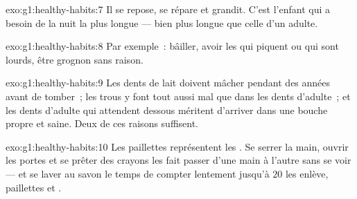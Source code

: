 \begin{solution}{exo:g1:healthy-habits:7}
Il se repose, se répare et grandit. C'est l'enfant qui a besoin de
la nuit la plus longue --- bien plus longue que celle d'un adulte.
\end{solution}

\begin{solution}{exo:g1:healthy-habits:8}
Par exemple~: bâiller, avoir les  qui piquent ou qui sont
lourds, être grognon sans raison.
\end{solution}

\begin{solution}{exo:g1:healthy-habits:9}
Les dents de lait doivent mâcher pendant des années avant de
tomber~; les trous y font tout aussi mal que dans les dents
d'adulte~; et les dents d'adulte qui attendent dessous méritent
d'arriver dans une bouche propre et saine. Deux de ces raisons
suffisent.
\end{solution}

\begin{solution}{exo:g1:healthy-habits:10}
Les paillettes représentent les . Se serrer la main, ouvrir
les portes et se prêter des crayons les fait passer d'une main à
l'autre sans se voir --- et se laver au savon le temps de compter
lentement jusqu'à $20$ les enlève, paillettes et .
\end{solution}

